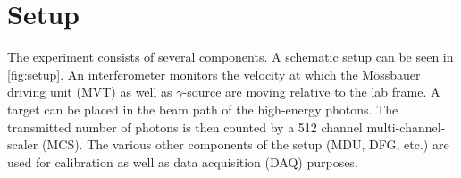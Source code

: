 
\section{Setup}
\label{sec:setup}

The experiment consists of several components. A schematic setup can be seen in 
\autoref{fig:setup}. An interferometer monitors the velocity at which the Mössbauer 
driving unit (MVT) as well as $\gamma$-source are moving relative to the lab frame.
A target can be placed in the beam path of the high-energy photons. The transmitted
number of photons is then counted by a 512 channel multi-channel-scaler (MCS). The 
various other components of the setup (MDU, DFG, etc.) are used for calibration as 
well as data acquisition (DAQ) purposes.
